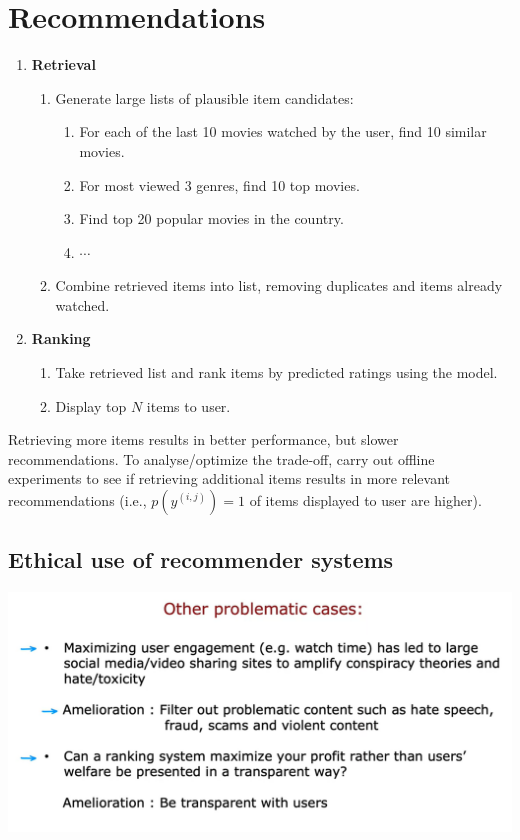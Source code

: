 \section{Recommendations}
\begin{enumerate}
    \item \textbf{Retrieval}
    \begin{enumerate}
        \item Generate large lists of plausible item candidates:
        \begin{enumerate}
            \item For each of the last 10 movies watched by the user, find 10 similar movies.
            \item For most viewed 3 genres, find 10 top movies.
            \item Find top 20 popular movies in the country.
            \item $\cdots$
        \end{enumerate}
        \item Combine retrieved items into list, removing duplicates and items already watched.
    \end{enumerate}
    \item \textbf{Ranking}
    \begin{enumerate}
        \item Take retrieved list and rank items by predicted ratings using the model.
        \item Display top $N$ items to user.
    \end{enumerate}
\end{enumerate}

\begin{notebox}
\hspace{2em}Retrieving more items results in better performance, but slower recommendations.
To analyse/optimize the trade-off, carry out offline experiments
to see if retrieving additional items results in more relevant recommendations 
(i.e., $p\left( {y}^{\left( i,j\right) }\right)  = 1 $ of items displayed to user are higher).
\end{notebox}

\subsection*{Ethical use of recommender systems}
\noindent
\includegraphics*[width=\textwidth]{images/16.4}

